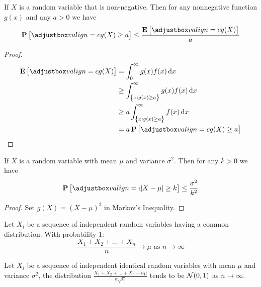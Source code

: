 \begin{theorem}
If $X$ is a random variable that is non-negative. Then for any nonnegative function $g(x)$ and any $a > 0$ we have 
\begin{equation}
    \probability{g(X) \geq a} \leq \frac{\expect{g(X)}}{a}
\end{equation}    
\end{theorem}
\begin{proof}
    \begin{equation*}
        \begin{aligned}
            \expect{g(X)} &= \int_0^\infty g(x) f(x) \dif{x} \\
            & \geq \int_{\set{x: g(x) \geq a}}^\infty g(x) f(x) \dif{x} \\
            & \geq a \int_{\set{x: g(x) \geq a}}^\infty f(x) \dif{x} \\
            &= a \probability{g(X) \geq a}
        \end{aligned}
    \end{equation*}
\end{proof}

\begin{theorem}
    If $X$ is a random variable with mean $\mu$ and variance $\sigma^2$. Then for any $k > 0$ we have
    \begin{equation}
        \probability{\absolutevalue{X - \mu} \geq k } \leq \frac{\sigma^2}{k^2}
    \end{equation}
\end{theorem}
\begin{proof}
    Set $g(X) = (X - \mu)^2$ in Markov's Inequality.
\end{proof}

\begin{theorem}
    Let $X_i$ be a sequence of independent random variables having a common distribution. With probability 1:
    \begin{equation}
        \frac{X_1 + X_2 + \dots + X_n}{n} \rightarrow \mu \text{ as } n \rightarrow \infty
    \end{equation}
\end{theorem}

\begin{theorem}
    Let $X_i$ be a sequence of independent identical random variables with mean $\mu$ and variance $\sigma^2$, the distribution $\displaystyle \frac{X_1 + X_2 + \dots + X_n - n \mu}{\sigma \sqrt{n}}$ tends to be $\mathcal{N}(0,1)$ as $n \rightarrow \infty$.
\end{theorem}






